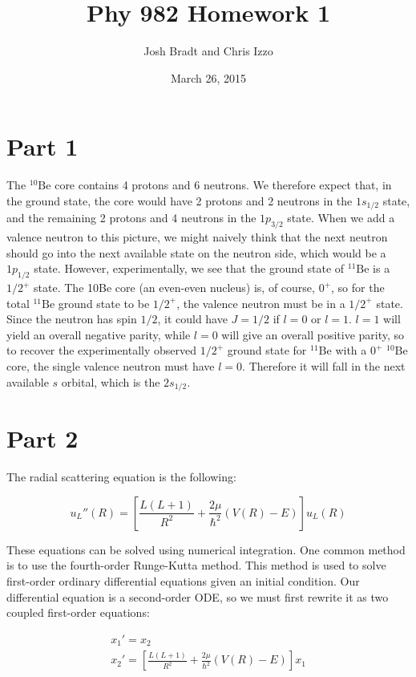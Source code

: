 \documentclass{article}
\title{Phy 982 Homework 1}
\author{Josh Bradt and Chris Izzo}
\date{March 26, 2015}
\newcommand{\nuc}[2]{${}^{#1}\text{#2}$}
\begin{document}
\maketitle

\section*{Part 1}


The \nuc{10}{Be} core contains 4 protons and 6 neutrons.  We therefore expect that, in the ground state, the core would have 2 protons and 2 neutrons in the $1s_{1/2}$ state, and the remaining 2 protons and 4 neutrons in the $1p_{3/2}$ state.  When we add a valence neutron to this picture, we might naively think that the next neutron should go into the next available state on the neutron side, which would be a $1p_{1/2}$ state.  However, experimentally, we see that the ground state of \nuc{11}{Be} is a $1/2^+$ state.  The 10Be core (an even-even nucleus) is, of course, $0^+$, so for the total \nuc{11}{Be} ground state to be $1/2^+$, the valence neutron must be in a $1/2^+$ state.  Since the neutron has spin $1/2$, it could have $J=1/2$ if $l=0$ or $l=1$.  $l=1$ will yield an overall negative parity, while $l=0$ will give an overall positive parity, so to recover the experimentally observed $1/2^+$ ground state for \nuc{11}{Be} with a $0^+$ \nuc{10}{Be} core, the single valence neutron must have $l=0$. Therefore it will fall in the next available $s$ orbital, which is the $2s_{1/2}$.

\section*{Part 2}

The radial scattering equation is the following:
	
\begin{equation}
	u_L''(R) = \left[ \frac{L(L+1)}{R^2} + \frac{2\mu}{\hbar^2} (V(R) - E) \right] u_L(R)
\end{equation}

These equations can be solved using numerical integration. One common method is to use the fourth-order Runge-Kutta method. This method is used to solve first-order ordinary differential equations given an initial condition. Our differential equation is a second-order ODE, so we must first rewrite it as two coupled first-order equations:

\begin{gather}
	x_1' = x_2 \\
	x_2' = \left[ \frac{L(L+1)}{R^2} + \frac{2\mu}{\hbar^2} (V(R) - E) \right] x_1
\end{gather}
\end{document}
